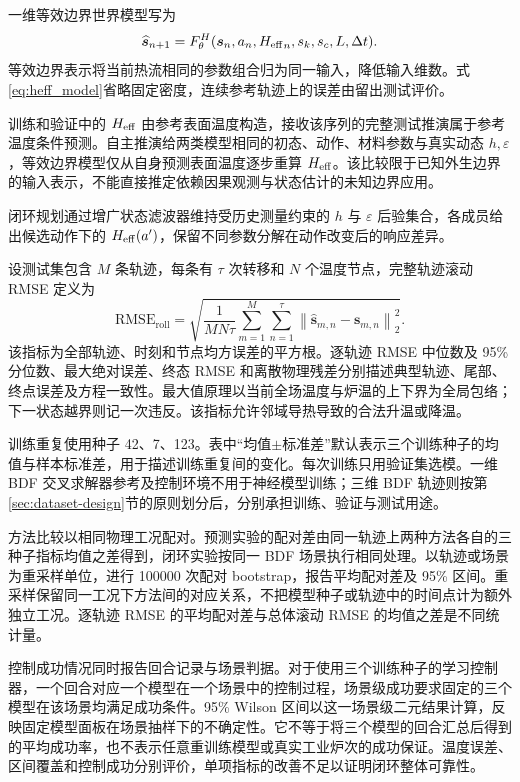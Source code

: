 一维等效边界世界模型写为
\begin{equation}
  \widehat{\bm{s}}_{n+1}
  =F_{\theta}^{H}(\bm{s}_n,a_n,{H_{\mathrm{eff}}}_n,s_k,s_c,L,\Delta t).
  \label{eq:heff_model}
\end{equation}
等效边界表示将当前热流相同的参数组合归为同一输入，降低输入维数。式\eqref{eq:heff_model}省略固定密度，连续参考轨迹上的误差由留出测试评价。

训练和验证中的 ${H_{\mathrm{eff}}}$ 由参考表面温度构造，接收该序列的完整测试推演属于参考温度条件预测。自主推演给两类模型相同的初态、动作、材料参数与真实动态 $h,\varepsilon$，等效边界模型仅从自身预测表面温度逐步重算 ${H_{\mathrm{eff}}}$。该比较限于已知外生边界的输入表示，不能直接推定依赖因果观测与状态估计的未知边界应用。

闭环规划通过增广状态滤波器维持受历史测量约束的 $h$ 与 $\varepsilon$ 后验集合，各成员给出候选动作下的 ${H_{\mathrm{eff}}}(a')$，保留不同参数分解在动作改变后的响应差异。

\label{sec:evaluation-protocol}

设测试集包含 $M$ 条轨迹，每条有 $\tau$ 次转移和 $N$ 个温度节点，完整轨迹滚动 RMSE 定义为
\begin{equation}
  \mathrm{RMSE}_{\mathrm{roll}}
  =\sqrt{\frac{1}{MN\tau}\sum_{m=1}^{M}\sum_{n=1}^{\tau}
  \left\|\widehat{\bm{s}}_{m,n}-\bm{s}_{m,n}\right\|_2^2}.
\end{equation}
该指标为全部轨迹、时刻和节点均方误差的平方根。逐轨迹 RMSE 中位数及 95\% 分位数、最大绝对误差、终态 RMSE 和离散物理残差分别描述典型轨迹、尾部、终点误差及方程一致性。最大值原理以当前全场温度与炉温的上下界为全局包络；下一状态越界则记一次违反。该指标允许邻域导热导致的合法升温或降温。

训练重复使用种子 42、7、123。表中“均值$\pm$标准差”默认表示三个训练种子的均值与样本标准差，用于描述训练重复间的变化。每次训练只用验证集选模。一维 BDF 交叉求解器参考及控制环境不用于神经模型训练；三维 BDF 轨迹则按第\ref{sec:dataset-design}节的原则划分后，分别承担训练、验证与测试用途。

方法比较以相同物理工况配对。预测实验的配对差由同一轨迹上两种方法各自的三种子指标均值之差得到，闭环实验按同一 BDF 场景执行相同处理。以轨迹或场景为重采样单位，进行 100000 次配对 bootstrap，报告平均配对差及 95\% 区间。重采样保留同一工况下方法间的对应关系，不把模型种子或轨迹中的时间点计为额外独立工况。逐轨迹 RMSE 的平均配对差与总体滚动 RMSE 的均值之差是不同统计量。

控制成功情况同时报告回合记录与场景判据。对于使用三个训练种子的学习控制器，一个回合对应一个模型在一个场景中的控制过程，场景级成功要求固定的三个模型在该场景均满足成功条件。95\% Wilson 区间以这一场景级二元结果计算，反映固定模型面板在场景抽样下的不确定性。它不等于将三个模型的回合汇总后得到的平均成功率，也不表示任意重训练模型或真实工业炉次的成功保证。温度误差、区间覆盖和控制成功分别评价，单项指标的改善不足以证明闭环整体可靠性。
